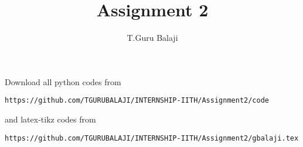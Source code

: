 \documentclass[journal,12pt,twocolumn]{IEEEtran}
\begin{document}
     \def\centbox#1{\makebox[0in]{#1}}
     \def\topbox#1{\raisebox{-\baselineskip}[0in][0in]{#1}}
     \def\midbox#1{\raisebox{-0.5\baselineskip}[0in][0in]{#1}}
\vspace{3cm}
\title{Assignment 2}
\author{T.Guru Balaji}
\maketitle
\newpage
\bigskip
\renewcommand{\thefigure}{\theenumi}
\renewcommand{\thetable}{\theenumi}
Download all python codes from 
\begin{lstlisting}
https://github.com/TGURUBALAJI/INTERNSHIP-IITH/Assignment2/code
\end{lstlisting}
%
and latex-tikz codes from 
%
\begin{lstlisting}
https://github.com/TGURUBALAJI/INTERNSHIP-IITH/Assignment2/gbalaji.tex
\end{lstlisting}
\vskip 1cm
\end{document}
